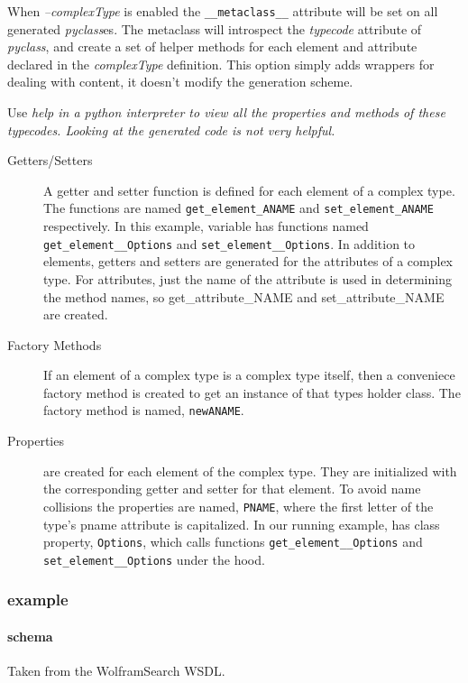 When {\it --complexType} is enabled the \verb!__metaclass__! attribute will be
set on all generated {\it pyclass}es.  The metaclass will introspect the {\it
typecode} attribute of {\it pyclass}, and create a set of helper methods for
each element and attribute declared in the {\it complexType} definition.  This
option simply adds wrappers for dealing with content, it doesn't modify the
generation scheme.

Use \it{help} in a python interpreter to view all the properties and methods of
these typecodes.  Looking at the generated code is not very helpful.

\begin{description}
\item[Getters/Setters] A getter and setter function is defined for each element
of a complex type.  The functions are named \verb!get_element_ANAME! and
\verb!set_element_ANAME! respectively.  In this example, variable 
has functions named \verb!get_element__Options! and \verb!set_element__Options!.
 In addition to elements, getters and setters are generated for the attributes
 of a complex type.  For attributes, just the name of the attribute is used in
 determining the method names, so get_attribute_NAME and set_attribute_NAME are
 created.

\item[Factory Methods] If an element of a complex type is a complex type itself,
then a conveniece factory method is created to get an instance of that types
holder class.  The factory method is named, \verb!newANAME!.

\item[Properties]
are created for each element of the complex type.  They are initialized with the
corresponding getter and setter for that element.  To avoid name collisions the
properties are named, \verb!PNAME!, where the first letter of the type's pname
attribute is capitalized.  In our running example,  has class
property, \verb!Options!, which calls functions \verb!get_element__Options! and
\verb!set_element__Options! under the hood.

\end{description}

\subsubsection{example}
\paragraph{schema}
Taken from the WolframSearch WSDL.

